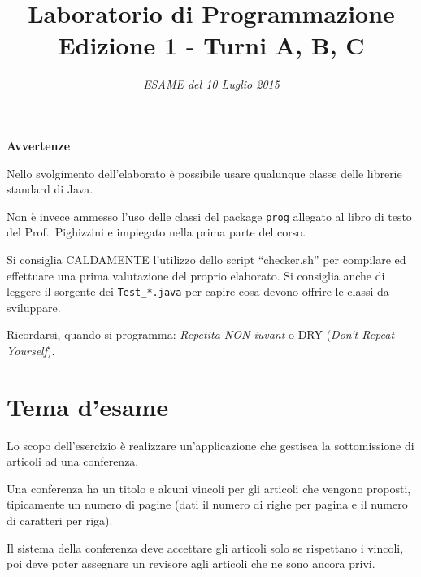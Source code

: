 \documentclass[a4paper]{article}
\title{Laboratorio di Programmazione\\
Edizione 1 - Turni A, B, C}
\date{\textit{ESAME del 10 Luglio 2015}}
\begin{document}
\maketitle

\textbf{Avvertenze}

\begin{compactitem}
\item 
Nello svolgimento dell'elaborato è possibile
usare qualunque classe delle librerie standard di Java.

\item Non è invece
ammesso l'uso delle classi del package {\tt prog} allegato al libro di
testo del Prof.~Pighizzini e impiegato nella prima parte del corso.

\item Si consiglia CALDAMENTE l'utilizzo dello script ``checker.sh'' per 
compilare ed effettuare una prima valutazione del proprio elaborato.
Si consiglia anche di leggere il sorgente dei \texttt{Test\_*.java} per 
capire cosa devono offrire le classi da sviluppare.

\item Ricordarsi, quando si programma: \emph{Repetita NON iuvant} o DRY (\emph{Don't Repeat Yourself}).


\end{compactitem}


\section*{Tema d'esame}

Lo scopo dell'esercizio è realizzare un'applicazione che gestisca la 
sottomissione di articoli ad una conferenza.

Una conferenza ha un titolo e alcuni vincoli per %
gli articoli 
che vengono proposti, tipicamente un numero di pagine (dati il numero di righe per 
pagina e il numero di caratteri per riga).

Il sistema della conferenza deve accettare gli articoli solo se rispettano i 
vincoli, poi deve poter assegnare un revisore agli articoli che ne sono ancora 
privi.
\end{document}
